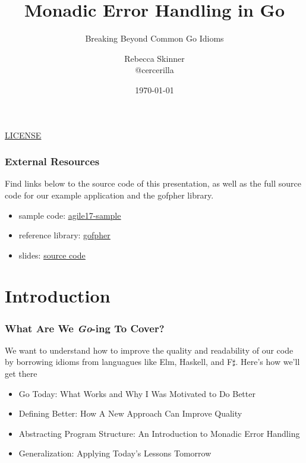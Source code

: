 \documentclass{beamer}
\title{Monadic Error Handling in Go}
\subtitle{Breaking Beyond Common Go Idioms}
\author{Rebecca Skinner\\ \small{@cercerilla}}
\institute{Asteris, LLC}
\date{\today}
\newcommand{\chref}[3] {
  {\color{#1} \href{#2}{\underline{#3}}}
}
\begin{document}
\begin{frame}
  \titlepage{}
  \begin{center}
    \small{\chref{blue}{http://creativecommons.org/licenses/by-sa/4.0/}{LICENSE}}
  \end{center}
\end{frame}

\begin{frame}
  \frametitle{External Resources}
  Find links below to the source code of this presentation, as well as
  the full source code for our example application and the gofpher
  library.
  \\\vfill
  \begin{itemize}
  \item sample code: \chref{blue}{https://github.com/rebeccaskinner/agile17-sample}{agile17-sample}
  \item reference library: \chref{blue}{https://github.com/rebeccaskinner/gofpher}{gofpher}
  \item slides: \chref{blue}{https://github.com/rebeccaskinner/presentations/tree/agile-tech-2017/agile_tech_conference_2017}{source code}
  \end{itemize}
\end{frame}

\section{Introduction}

\begin{frame}
  \frametitle{What Are We \emph{Go}-ing To Cover?}
  We want to understand how to improve the quality and readability of
  our code by borrowing idioms from languagues like Elm, Haskell, and
  F$\sharp$.  Here's how we'll get there
  \\\vfill
  \begin{itemize}
  \item Go Today: What Works and Why I Was Motivated to Do Better
  \item Defining Better: How A New Approach Can Improve Quality
  \item Abstracting Program Structure: An Introduction to Monadic Error Handling
  \item Generalization: Applying Today's Lessons Tomorrow
  \end{itemize}
\end{frame}
\end{document}
